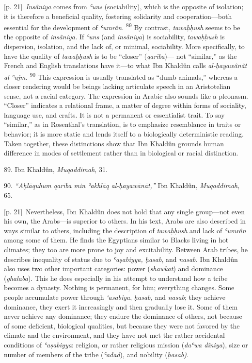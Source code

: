 \documentclass[10pt,a4paper]{article}
\begin{document}
{\scriptsize\color{gray} [p. 21]}\ \textit{Insâniya} comes from \textit{ʿuns} (sociability), which is the opposite of isolation; it is therefore a beneficial quality, fostering solidarity and cooperation—both essential for the development of \textit{ʿumrân.} \nobreak\textsuperscript{89} By contrast, \textit{tawaḥḥush} seems to be the opposite of \textit{insâniya.} If \textit{ʿuns} (and \textit{insâniya}) is sociability, \textit{tawaḥḥush} is dispersion, isolation, and the lack of, or minimal, sociability. More specifically, to have the quality of \textit{tawaḥḥush} is to be “closer” (\textit{qarība})— not “similar,” as the French and English translations have it—to what Ibn Khaldûn calls \textit{al-ḥayawânât al-ʿujm.} \nobreak\textsuperscript{90} This expression is usually translated as “dumb animals,” whereas a closer rendering would be beings lacking articulate speech in an Aristotelian sense, not a racial category. The expression in Arabic also sounds like a pleonasm. “Closer” indicates a relational frame, a matter of degree within forms of sociality, language use, and crafts. It is not a permanent or essentialist trait. To say “similar,” as in Rosenthal’s translation, is to emphasize resemblance in traits or behavior; it is more static and lends itself to a biologically deterministic reading. Taken together, these distinctions show that Ibn Khaldûn grounds human difference in modes of settlement rather than in biological or racial distinction.\par{\small 89. Ibn Khaldûn, \textit{Muqaddimah}, 31.\par}{\small 90. \textit{“Aḫlāquhum qarība min ʾakhlāq al-ḥayawānāt,”} Ibn Khaldûn, \textit{Muqaddimah}, 65.\par}
{\scriptsize\color{gray} [p. 21]}\ Nevertheless, Ibn Khaldûn does not hold that any single group—not even his own, the Arabs—is superior to others. In his text, Arabs are also described in ways similar to others, including the description of \textit{tawaḥḥush} and lack of \textit{ʿumrân} among some of them. He finds the Egyptians similar to Blacks living in hot climates; they too are more prone to joy and excitability. Between Arab tribes, he describes inequality of status due to \textit{ʿaṣabiyya, ḥasab}, and \textit{nasab.} Ibn Khaldûn also uses two other important categories: power (\textit{shawkat}) and dominance (\textit{ghalaba}). This he does especially in his attempt to understand how a tribe becomes a dynasty. Nothing is permanent, for him; everything changes. Some people accumulate power through \textit{`asabiya}, \textit{ḥasab,} and \textit{nasab}; they achieve dominance, they exert it increasingly and then gradually lose it. Some of them never achieve any dominance; they endure the dominance of others, not because of some deficient, biological qualities, but because they were not favored by the climate and the environment, and they have not met the rather accidental conditions of \textit{ʿaṣabiyya}: religion, or rather religious mission (\textit{daʿwa dîniya}), size or number of members of the tribe (\textit{ʿadad}), and nobility (\textit{ḥasab).}\par
\end{document}
